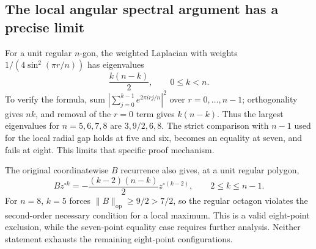 \documentclass[11pt]{article}
\theoremstyle{remark}
\numberwithin{equation}{section}
\begin{document}
\subsection{The local angular spectral argument has a precise limit}
For a unit regular $n$-gon, the weighted Laplacian with weights
$1/(4\sin^2(\pi r/n))$ has eigenvalues
\[
                         \frac{k(n-k)}2,
                         \qquad 0\le k<n.
\]
To verify the formula, sum
$|\sum_{j=0}^{k-1}e^{2\pi irj/n}|^2$ over $r=0,\ldots,n-1$;
orthogonality gives $nk$, and removal of the $r=0$ term gives
$k(n-k)$. Thus the largest eigenvalues for $n=5,6,7,8$ are
$3,9/2,6,8$. The strict comparison with $n-1$ used for the local
radial gap holds at five and six, becomes an equality at seven,
and fails at eight. This limits that specific proof mechanism.

The original coordinatewise $B$ recurrence also gives, at a unit
regular polygon,
\[
 Bz^{\circ k}=-\frac{(k-2)(n-k)}2z^{\circ(k-2)},
 \qquad 2\le k\le n-1.
\]
For $n=8$, $k=5$ forces $\lVert B\rVert_{\mathrm{op}}\ge9/2>7/2$,
so the regular octagon violates the second-order necessary condition
for a local maximum. This is a valid eight-point exclusion, while the
seven-point equality case requires further analysis. Neither statement
exhausts the remaining eight-point configurations.
\end{document}

